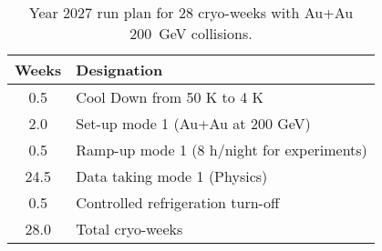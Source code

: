 \begin{table}
\centering
\begin{tabular}{ | c | l | }
\hline
Weeks & Designation \\ \hline
0.5  & Cool Down from 50 K to 4 K \\ \hline
2.0  & Set-up mode 1 (Au+Au at 200 GeV) \\ \hline
0.5  & Ramp-up mode 1 (8 h/night for experiments) \\ \hline
24.5 & Data taking mode 1 (Physics) \\ \hline
0.5  & Controlled refrigeration turn-off \\ \hline \hline \hline
28.0 & Total cryo-weeks \\
\hline
\end{tabular}
\caption{Year 2027 run plan for 28 cryo-weeks with Au+Au 200~GeV collisions.
\label{tab:cryoplan2027}}
\end{table}

